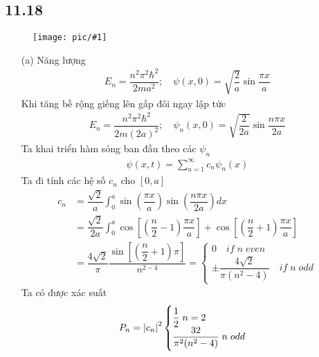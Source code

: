 \documentclass{article}
\newcommand{\image}[1]{
	\begin{figure}[H]
		\centering
		\texttt{[image: pic/\#1]}
		\label{#1}
	\end{figure}
}
\newcommand{\f}[2]{\dfrac{#1}{#2}}
\begin{document}
\subsection*{11.18}
\image{11.18.png}
\begin{enumerate}
	\item [(a)] 
	Năng lượng 
	\begin{gather*}
		E_{n} = \f{n^{2} \pi^{2} \hbar^{2}}{2ma^{2}}; \quad \psi(x,0) = \sqrt{\f{2}{a}} \sin \f{\pi x}{a} 
	\end{gather*}  
	Khi tăng bề rộng giếng lên gấp đôi ngay lập tức
	\begin{gather*}
		E_{n} = \f{n^{2} \pi^{2} \hbar^{2}}{2m(2a)^{2}}; \quad \psi_{n}(x,0) = \sqrt{\f{2}{2a}} \sin \f{n\pi x}{2a}
	\end{gather*}
	Ta khai triển hàm sóng ban đầu theo các $\psi_{n}$
	\begin{gather*}
		\psi(x,t) = \sum_{n=1}^{\infty}c_{n} \psi_{n}(x)
	\end{gather*}
	Ta đi tính các hệ số $c_{n}$ cho $\left[0,a\right]$
	\begin{equation*}
		\begin{aligned}
			c_{n}
			&= \f{\sqrt{2}}{a} \int_{0}^{a} \sin\left(\f{\pi x}{a}\right) \sin \left(\f{n\pi x}{2a}\right) dx\\
			&= \f{\sqrt{2}}{2a} \int_{0}^{a} \cos \left[\left(\f{n}{2} - 1\right)\f{\pi x}{a}\right] + \cos \left[\left(\f{n}{2} + 1\right)\f{\pi x}{a}\right]\\
			&= \f{4\sqrt{2}}{\pi} \f{\sin\left[(\f{n}{2} + 1)\pi\right]}{n^{2 - 4}}
			=
			\begin{cases}
				0 \quad if \; n \; even\\
				\pm \f{4\sqrt{2}}{\pi(n^{2} - 4)} \quad if \; n \; odd
			\end{cases}
		\end{aligned}
	\end{equation*}
	Ta có được xác suất 
	\begin{gather*}
		P_{n} = \abs{c_{n}}^{2}
		\begin{cases}
			\f{1}{2} \; n = 2\\
			\f{32}{\pi^{2} (n^{2} - 4)} \; n \; odd
		\end{cases}
	\end{gather*}
\end{enumerate}
\end{document}
